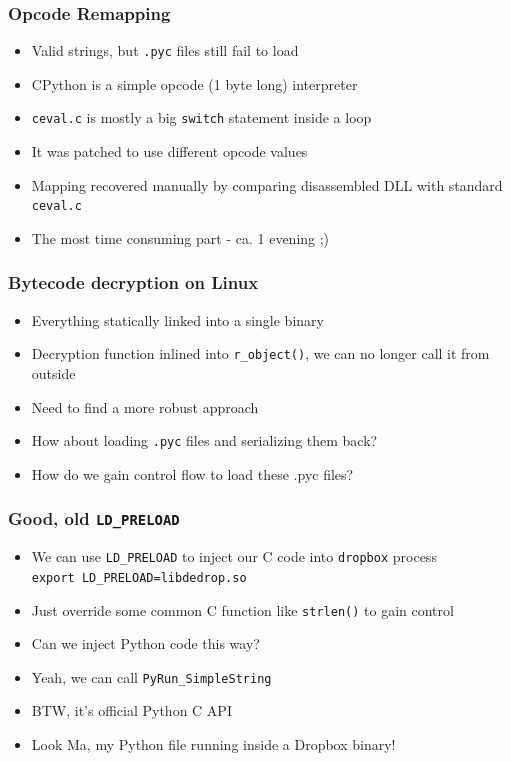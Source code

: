 \documentclass{beamer}
\newcommand\myfont{\fontsize{14}{20}\selectfont}
\begin{document}
\begin{frame}
\frametitle{Opcode Remapping}
\begin{itemize}
\itemsep 2em
\item{Valid strings, but \texttt{.pyc} files still fail to load}
\item{CPython is a simple opcode (1 byte long) interpreter}
\item{\texttt{ceval.c} is mostly a big \texttt{switch} statement inside a loop}
\item{It was patched to use different opcode values}
\item{Mapping recovered manually by comparing disassembled DLL with standard \texttt{ceval.c}}
\item{The most time consuming part - ca. 1 evening ;)}
\end{itemize}
\end{frame}

\begin{frame}
\frametitle{Bytecode decryption on Linux}
\myfont
\begin{itemize}
\itemsep 1em
\item{Everything statically linked into a single binary}
\item{Decryption function inlined into \texttt{r\_object()}, we can no longer call it from outside}
\item{Need to find a more robust approach}
\item{How about loading \texttt{.pyc} files and serializing them back?}
\item{How do we gain control flow to load these .pyc files?}
\end{itemize}
\end{frame}

\begin{frame}
\frametitle{Good, old \texttt{LD\_PRELOAD}}
\begin{itemize}
\itemsep 1em
\item{We can use \texttt{LD\_PRELOAD} to inject our C code into \texttt{dropbox} process} \\
	\vspace{1em} {\texttt{export LD\_PRELOAD=libdedrop.so}}
\item{Just override some common C function like \texttt{strlen()} to gain control}
\item{Can we inject Python code this way?}
\item{Yeah, we can call \texttt{PyRun\_SimpleString}}
\item{BTW, it's official Python C API}
\item{Look Ma, my Python file running inside a Dropbox binary!}
\end{itemize}
\end{frame}
\end{document}
